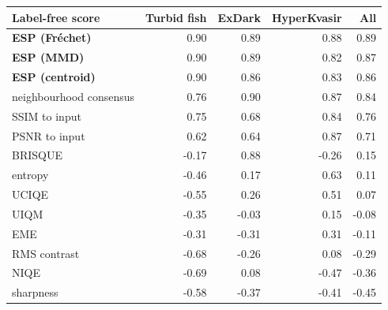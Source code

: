 \begin{tabular}{lrrrr}
\toprule
Label-free score & Turbid fish & ExDark & HyperKvasir & All \\
\midrule
\textbf{ESP (Fr\'echet)} & 0.90 & 0.89 & 0.88 & 0.89 \\
\textbf{ESP (MMD)} & 0.90 & 0.89 & 0.82 & 0.87 \\
\textbf{ESP (centroid)} & 0.90 & 0.86 & 0.83 & 0.86 \\
neighbourhood consensus & 0.76 & 0.90 & 0.87 & 0.84 \\
SSIM to input & 0.75 & 0.68 & 0.84 & 0.76 \\
PSNR to input & 0.62 & 0.64 & 0.87 & 0.71 \\
BRISQUE & -0.17 & 0.88 & -0.26 & 0.15 \\
entropy & -0.46 & 0.17 & 0.63 & 0.11 \\
UCIQE & -0.55 & 0.26 & 0.51 & 0.07 \\
UIQM & -0.35 & -0.03 & 0.15 & -0.08 \\
EME & -0.31 & -0.31 & 0.31 & -0.11 \\
RMS contrast & -0.68 & -0.26 & 0.08 & -0.29 \\
NIQE & -0.69 & 0.08 & -0.47 & -0.36 \\
sharpness & -0.58 & -0.37 & -0.41 & -0.45 \\
\bottomrule
\end{tabular}